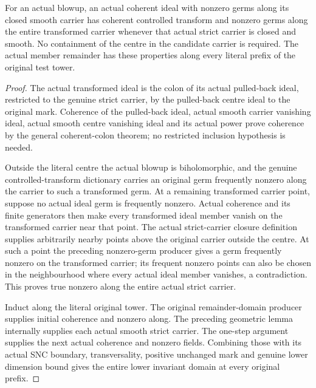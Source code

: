 \begin{lemma}
\label{hir:member-tail-actual-coherent-nonzero}
\leanok
For an actual blowup, an actual coherent ideal with nonzero germs along its
closed smooth carrier has coherent controlled transform and nonzero germs
along the entire transformed carrier whenever that actual strict carrier is
closed and smooth. No containment of the centre in the candidate carrier is
required. The actual member remainder has these properties along every
literal prefix of the original test tower.
\end{lemma}
\begin{proof}
The actual transformed ideal is the colon of its actual pulled-back ideal,
restricted to the genuine strict carrier, by the pulled-back centre ideal to
the original mark. Coherence of the pulled-back ideal, actual smooth carrier
vanishing ideal, actual smooth centre vanishing ideal and its actual power
prove coherence by the general coherent-colon theorem; no restricted inclusion
hypothesis is needed.

Outside the literal centre the actual blowup is biholomorphic, and the genuine
controlled-transform dictionary carries an original germ frequently nonzero
along the carrier to such a transformed germ. At a remaining transformed
carrier point, suppose no actual ideal germ is frequently nonzero. Actual
coherence and its finite generators then make every transformed ideal member
vanish on the transformed carrier near that point. The actual strict-carrier
closure definition supplies arbitrarily nearby points above the original
carrier outside the centre. At such a point the preceding nonzero-germ
producer gives a germ frequently nonzero on the transformed carrier; its
frequent nonzero points can also be chosen in the neighbourhood where every
actual ideal member vanishes, a contradiction. This proves true nonzero along
the entire actual strict carrier.

Induct along the literal original tower. The original remainder-domain
producer supplies initial coherence and nonzero along. The preceding geometric
lemma internally supplies each actual smooth strict carrier. The one-step
argument supplies the next actual coherence and nonzero fields. Combining
those with its actual SNC boundary, transversality, positive unchanged mark
and genuine lower dimension bound gives the entire lower invariant domain
at every original prefix.
\end{proof}

